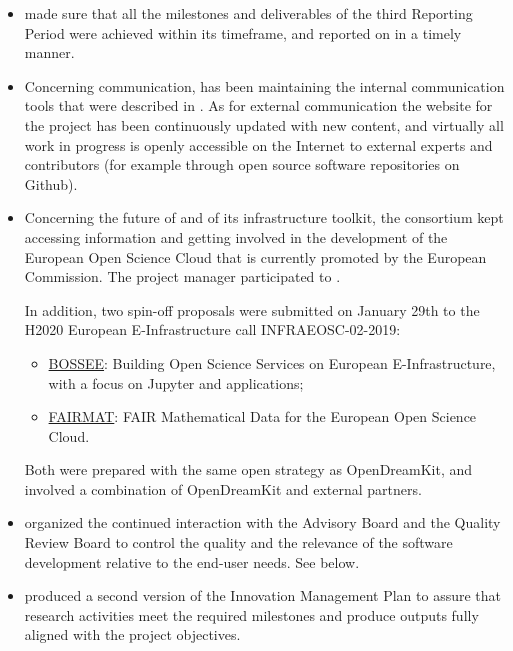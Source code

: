 \begin{itemize}
\item {} made sure that all the milestones and deliverables of
  the third Reporting Period were achieved within its timeframe, and
  reported on in a timely manner.
\item Concerning communication,  has been maintaining the
  internal communication tools that were described in
  . As for external
  communication the website for the project has been continuously
  updated with new content, and virtually all work in progress is
  openly accessible on the Internet to external experts and
  contributors (for example through open source software repositories
  on Github).
\item Concerning the future of \ODK and of its infrastructure toolkit,
  the consortium kept accessing information and getting involved in
  the development of the European Open Science Cloud that is currently
  promoted by the European Commission. The project manager
  participated to .

  In addition, two spin-off proposals were submitted on January 29th
  to the H2020 European E-Infrastructure call INFRAEOSC-02-2019:
  \begin{itemize}
  \item \href{https://github.com/bossee-project/proposal}{BOSSEE}:
    Building Open Science Services on European E-Infrastructure, with
    a focus on Jupyter and applications;
  \item \href{https://opendreamkit.org/2019/01/29/FAIRmat/}{FAIRMAT}:
    FAIR Mathematical Data for the European Open Science Cloud.
  \end{itemize}
  Both were prepared with the same open strategy as OpenDreamKit, and
  involved a combination of OpenDreamKit and external partners.

\item {} organized the continued interaction with the Advisory
  Board and the Quality Review Board to control the quality and the
  relevance of the software development relative to the end-user
  needs. See below.
\item {} produced a second version of the Innovation Management Plan
 to assure that research activities meet the required milestones and produce outputs fully aligned with the project objectives.


\end{itemize}
